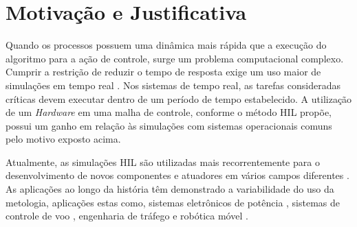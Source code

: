 \section{Motivação e Justificativa}

Quando os processos possuem uma dinâmica mais rápida que a execução do algoritmo para a ação 
de controle, surge um problema computacional complexo. Cumprir a restrição de reduzir o tempo
de resposta exige um uso maior de simulações em tempo real \cite{Isermann}. Nos sistemas de 
tempo real, as tarefas consideradas críticas devem executar dentro de um período de tempo 
estabelecido. A utilização de um \textit{Hardware} em uma malha de controle, conforme o 
método HIL propõe, possui um ganho em relação às simulações com 
sistemas operacionais comuns pelo motivo exposto acima.

Atualmente, as simulações HIL são utilizadas mais recorrentemente
para o desenvolvimento de novos componentes e atuadores em vários campos
diferentes \cite{Bouscayrol}. As aplicações ao longo da história têm demonstrado a 
variabilidade do uso da metologia, aplicações estas como, sistemas eletrônicos de 
potência \cite{Rothstein}, sistemas de controle de voo \cite{Karpenko}, engenharia 
de tráfego \cite{Bullock} e robótica móvel \cite{Kamali}.



